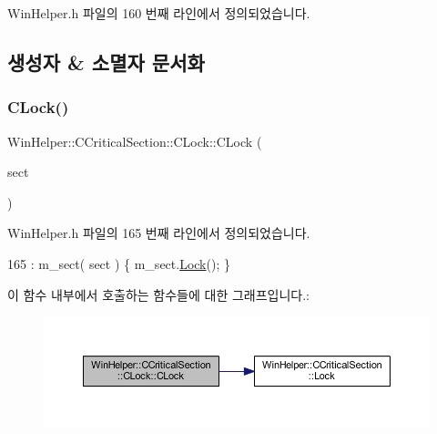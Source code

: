Win\+Helper.\+h 파일의 160 번째 라인에서 정의되었습니다.



\subsection{생성자 \& 소멸자 문서화}
\mbox{\label{class_win_helper_1_1_c_critical_section_1_1_c_lock_a68cee1cb129d83775f678a4bde96c049}} 
\subsubsection{\texorpdfstring{C\+Lock()}{CLock()}}
{\footnotesize\ttfamily Win\+Helper\+::\+C\+Critical\+Section\+::\+C\+Lock\+::\+C\+Lock (\begin{DoxyParamCaption}\item[{\mbox{\hyperlink{class_win_helper_1_1_c_critical_section}{C\+Critical\+Section}} \&}]{sect }\end{DoxyParamCaption})\hspace{0.3cm}{\ttfamily [inline]}}



Win\+Helper.\+h 파일의 165 번째 라인에서 정의되었습니다.


\begin{DoxyCode}
165 : m\_sect( sect ) \{ m\_sect.\mbox{\hyperlink{class_win_helper_1_1_c_critical_section_aa0c20ee0e7de698b37c26a295d0f45fe}{Lock}}(); \}
\end{DoxyCode}
이 함수 내부에서 호출하는 함수들에 대한 그래프입니다.\+:
\nopagebreak
\begin{figure}[H]
\begin{center}
\leavevmode
\includegraphics[width=350pt]{class_win_helper_1_1_c_critical_section_1_1_c_lock_a68cee1cb129d83775f678a4bde96c049_cgraph}
\end{center}
\end{figure}
\mbox{\label{class_win_helper_1_1_c_critical_section_1_1_c_lock_abbd6d830a932e4ba03735171d39afe81}} 
